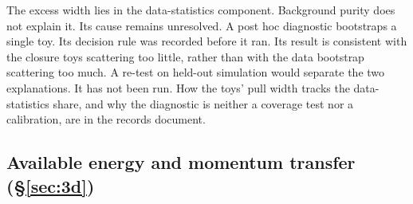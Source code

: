 The excess width lies in the data-statistics component. Background purity does not explain it. Its cause remains unresolved. A post hoc diagnostic bootstraps a single toy. Its decision rule was recorded before it ran. Its result is consistent with the closure toys scattering too little, rather than with the data bootstrap scattering too much. A re-test on held-out simulation would separate the two explanations. It has not been run. How the toys' pull width tracks the data-statistics share, and why the diagnostic is neither a coverage test nor a calibration, are in the records document.

\subsection{Available energy and momentum transfer (\S\ref{sec:3d})}
\label{app:devhistory-3d}

